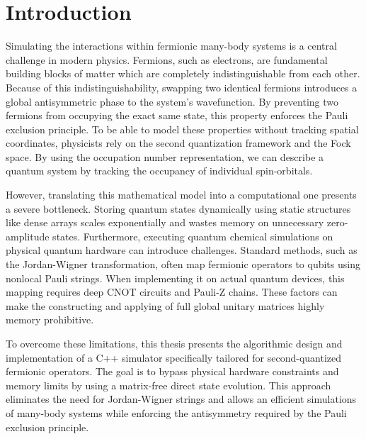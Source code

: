 \chapter{Introduction}
\label{c:introduction}

Simulating the interactions within fermionic many-body systems is a central challenge in modern physics.
Fermions, such as electrons, are fundamental building blocks of matter which are completely indistinguishable from each other.
Because of this indistinguishability, swapping two identical fermions introduces a global antisymmetric phase to the system's wavefunction.
By preventing two fermions from occupying the exact same state, this property enforces the Pauli exclusion principle.
To be able to model these properties without tracking spatial coordinates, physicists rely on the second quantization framework and the Fock space.
By using the occupation number representation, we can describe a quantum system by tracking the occupancy of individual spin-orbitals.

However, translating this mathematical model into a computational one presents a severe bottleneck.
Storing quantum states dynamically using static structures like dense arrays scales exponentially and wastes memory on unnecessary zero-amplitude states.
Furthermore, executing quantum chemical simulations on physical quantum hardware can introduce challenges.
Standard methods, such as the Jordan-Wigner transformation, often map fermionic operators to qubits using nonlocal Pauli strings.
When implementing it on actual quantum devices, this mapping requires deep CNOT circuits and Pauli-Z chains.
These factors can make the constructing and applying of full global unitary matrices highly memory prohibitive.

To overcome these limitations, this thesis presents the algorithmic design and implementation of a C++ simulator specifically tailored for second-quantized fermionic operators.
The goal is to bypass physical hardware constraints and memory limits by using a matrix-free direct state evolution.
This approach eliminates the need for Jordan-Wigner strings and allows an efficient simulations of many-body systems while enforcing the antisymmetry required by the Pauli exclusion principle.

